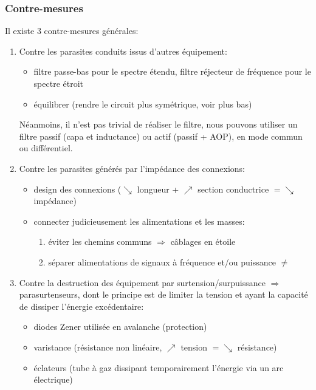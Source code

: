 \subsubsection{Contre-mesures}
Il existe 3 contre-mesures générales:
\begin{enumerate}
	\item Contre les parasites conduits issus d'autres équipement:
	\begin{itemize}
		\item filtre passe-bas pour le spectre étendu, filtre réjecteur de fréquence pour le spectre étroit
		\item équilibrer (rendre le circuit plus symétrique, voir plus bas)
	\end{itemize}
 \hspace*{\dimexpr\linewidth-\textwidth\relax}%
 \begin{minipage}[t]{\textwidth}%
 	Néanmoins, il n'est pas trivial de réaliser le filtre, nous pouvons utiliser un filtre passif (capa et inductance) ou actif (passif + AOP), en mode commun ou différentiel.
 \end{minipage} 
	\item Contre les parasites générés par l'impédance des connexions:
	\begin{itemize}
		\item design des connexions (\(\searrow\) longueur + \(\nearrow\) section conductrice \(= \searrow\) impédance)
		\item connecter judicieusement les alimentations et les masses:
		\begin{enumerate}
			\item éviter les chemins communs \(\Rightarrow\) câblages en étoile
			\item séparer alimentations de signaux à fréquence et/ou puissance \(\neq\)
		\end{enumerate}	
	\end{itemize}
	\item Contre la destruction des équipement par surtension/surpuissance \(\Rightarrow\) parasurtenseurs, dont le principe est de limiter la tension  et ayant la capacité de dissiper l'énergie excédentaire:
	\begin{itemize}
		\item diodes Zener utilisée en avalanche (protection)
		\item varistance (résistance non linéaire, \(\nearrow\) tension \(= \searrow\) résistance)
		\item éclateurs (tube à gaz dissipant temporairement l'énergie via un arc électrique)
	\end{itemize}
\end{enumerate}
